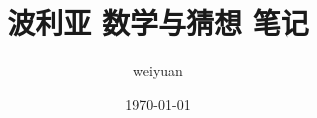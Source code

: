 %
%
%
%
%

\documentclass[mode=geye ]{ elegantnote}
\title{波利亚 数学与猜想 笔记}
\author{weiyuan}
\date{\today}

	\maketitle
	\section{归纳方法}
	一个猜想性的一般命题若能在新特例中得到证实，则变得更加可信。\\
	\begin{enumerate}
		\item 随时准备修正我们的信念
		\item 有充分理由使我们改变信念，则应改变
		\item 无充分理由，不应轻易改变信念
	\end{enumerate}
	
	例题：
	
	1. 找规律
	\begin{gather*}
		11, 31, 41, 61, 71, 101, 131, \dots
	\end{gather*}
	以上数字都是素数
	\begin{gather*}
		21 = 3 \\
		51 = 3 \\
		81 = 3^4\\
		91 = 7 \\
		111 = 3  \\
		121 = 11^2 \\
		141 = 3 \\
	\end{gather*}


